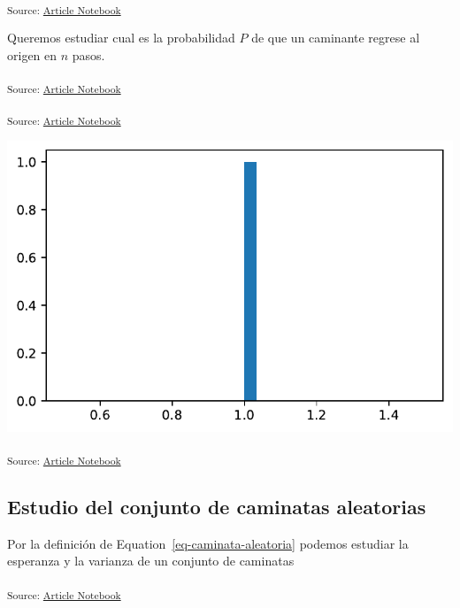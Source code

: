\documentclass[
  letterpaper,
  DIV=11,
  numbers=noendperiod]{scrartcl}
\begin{document}
\textsubscript{Source:
\href{https://akielbowicz.github.io/pyday-la-plata-2024/index.qmd.html}{Article
Notebook}}

Queremos estudiar cual es la probabilidad \(P\) de que un caminante
regrese al origen en \(n\) pasos.

\textsubscript{Source:
\href{https://akielbowicz.github.io/pyday-la-plata-2024/index.qmd.html}{Article
Notebook}}

\textsubscript{Source:
\href{https://akielbowicz.github.io/pyday-la-plata-2024/index.qmd.html}{Article
Notebook}}

\includegraphics{index_files/figure-pdf/cell-6-output-1.pdf}

\textsubscript{Source:
\href{https://akielbowicz.github.io/pyday-la-plata-2024/index.qmd.html}{Article
Notebook}}

\subsection{Estudio del conjunto de caminatas
aleatorias}\label{estudio-del-conjunto-de-caminatas-aleatorias}

Por la definición de Equation~\ref{eq-caminata-aleatoria} podemos
estudiar la esperanza y la varianza de un conjunto de caminatas

\textsubscript{Source:
\href{https://akielbowicz.github.io/pyday-la-plata-2024/index.qmd.html}{Article
Notebook}}
\end{document}
